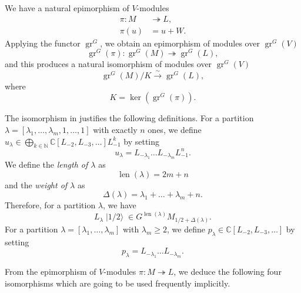 \documentclass[a4paper, 12pt, reqno]{amsart}
\theoremstyle{remark}
\DeclareMathOperator{\gr}{gr}
\DeclareMathOperator{\len}{len}
\DeclareMathOperator{\vachalf}{|1/2\rangle}
\begin{document}
We have a natural epimorphism of $V$-modules
\begin{align*}
  \pi: M &\twoheadrightarrow L, \\
  \pi(u) &= u + W.
\end{align*}
Applying the functor $\gr^G$, we obtain an epimorphism of modules over $\gr^G(V)$
\begin{equation*}
  \gr^G(\pi): \gr^G(M) \twoheadrightarrow \gr^G(L),
\end{equation*}
and this produces a natural isomorphism of modules over $\gr^G(V)$
\begin{equation*}
  \gr^G(M)/K \xrightarrow{\sim} \gr^G(L),
\end{equation*}
where
\begin{equation}
  \label{eq:49}
  K = \ker(\gr^G(\pi)).
\end{equation}

The isomorphism in  justifies the following definitions.
For a partition $\lambda = [\lambda_1, \dots, \lambda_m, 1, \dots, 1]$ with exactly $n$ ones, we define $u_{\lambda} \in \bigoplus_{k \in \mathbb{N}}\mathbb{C}[L_{-2}, L_{-3}, \dots]L_{-1}^k$ by setting
\begin{equation*}
  u_{\lambda} = L_{-\lambda_1}\dots L_{-\lambda_m}L_{-1}^n.
\end{equation*}
We define the \emph{length of $\lambda$} as
\begin{equation*}
  \len(\lambda) = 2m + n
\end{equation*}
and the \emph{weight of $\lambda$} as
\begin{equation*}
  \Delta(\lambda) = \lambda_1 + \dots + \lambda_m + n.
\end{equation*}
Therefore, for a partition $\lambda$, we have
\begin{equation*}
  L_{\lambda}\vachalf \in G^{\len(\lambda)}M_{1/2 + \Delta(\lambda)}.
\end{equation*}
For a partition $\lambda = [\lambda_1, \dots, \lambda_m]$ with $\lambda_m \ge 2$, we define $p_{\lambda} \in \mathbb{C}[L_{-2}, L_{-3}, \dots]$ by setting
\begin{equation*}
  p_{\lambda} = L_{-\lambda_1}\dots L_{-\lambda_m}.
\end{equation*}

From the epimorphism of $V$-modules $\pi: M \twoheadrightarrow L$, we deduce the following four isomorphisms which are going to be used frequently implicitly.
\end{document}
